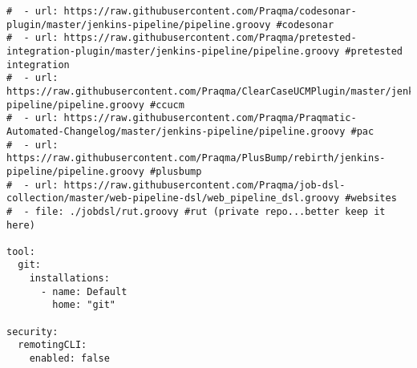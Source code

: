 \begin{verbatim}
#  - url: https://raw.githubusercontent.com/Praqma/codesonar-plugin/master/jenkins-pipeline/pipeline.groovy #codesonar
#  - url: https://raw.githubusercontent.com/Praqma/pretested-integration-plugin/master/jenkins-pipeline/pipeline.groovy #pretested integration
#  - url: https://raw.githubusercontent.com/Praqma/ClearCaseUCMPlugin/master/jenkins-pipeline/pipeline.groovy #ccucm
#  - url: https://raw.githubusercontent.com/Praqma/Praqmatic-Automated-Changelog/master/jenkins-pipeline/pipeline.groovy #pac
#  - url: https://raw.githubusercontent.com/Praqma/PlusBump/rebirth/jenkins-pipeline/pipeline.groovy #plusbump
#  - url: https://raw.githubusercontent.com/Praqma/job-dsl-collection/master/web-pipeline-dsl/web_pipeline_dsl.groovy #websites
#  - file: ./jobdsl/rut.groovy #rut (private repo...better keep it here)

tool:
  git:
    installations:
      - name: Default
        home: "git"

security:
  remotingCLI:
    enabled: false
\end{verbatim}


